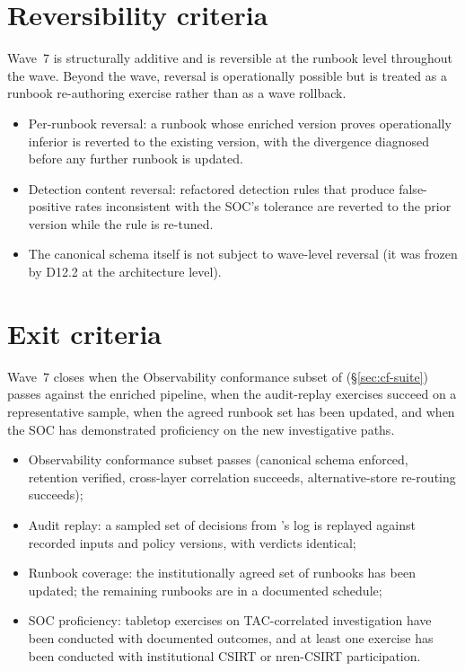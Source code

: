 \section{Reversibility criteria}
\label{sec:w7-reversibility}

Wave~7 is structurally additive and is reversible at the
runbook level throughout the wave. Beyond the wave, reversal is
operationally possible but is treated as a runbook re-authoring
exercise rather than as a wave rollback.

\begin{itemize}[leftmargin=1.5em,nosep]
  \item Per-runbook reversal: a runbook whose enriched version
    proves operationally inferior is reverted to the existing
    version, with the divergence diagnosed before any further
    runbook is updated.
  \item Detection content reversal: refactored detection rules
    that produce false-positive rates inconsistent with the
    SOC's tolerance are reverted to the prior version while the
    rule is re-tuned.
  \item The canonical schema itself is not subject to wave-level
    reversal (it was frozen by D12.2 at the architecture level).
\end{itemize}

\section{Exit criteria}
\label{sec:w7-exit}

Wave~7 closes when the Observability conformance subset of
 (\S\ref{sec:cf-suite}) passes against
the enriched pipeline, when the audit-replay exercises succeed
on a representative sample, when the agreed runbook set has
been updated, and when the SOC has demonstrated proficiency on
the new investigative paths.

\begin{itemize}[leftmargin=1.5em,nosep]
  \item Observability conformance subset passes (canonical
    schema enforced, retention verified, cross-layer correlation
    succeeds, alternative-store re-routing succeeds);
  \item Audit replay: a sampled set of decisions from
    's log is replayed against recorded
    inputs and policy versions, with verdicts identical;
  \item Runbook coverage: the institutionally agreed set of
    runbooks has been updated; the remaining runbooks are in a
    documented schedule;
  \item SOC proficiency: tabletop exercises on TAC-correlated
    investigation have been conducted with documented outcomes,
    and at least one exercise has been conducted with
    institutional CSIRT or \gls{nren}-CSIRT participation.
\end{itemize}

